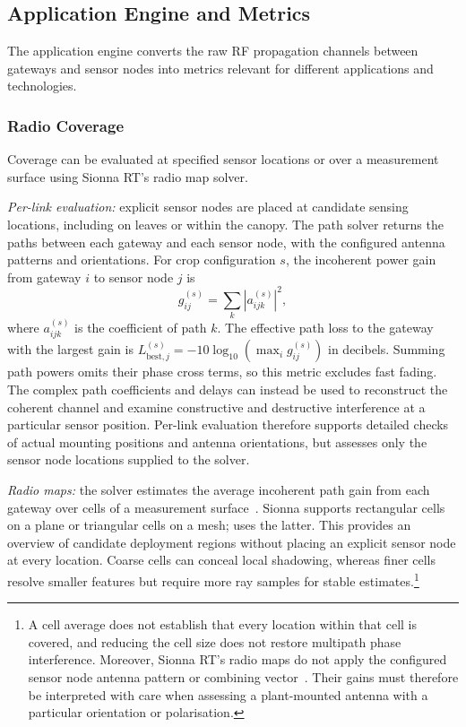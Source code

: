 \subsection{Application Engine and Metrics}\label{sec:metrics}
The application engine converts the raw RF propagation channels between gateways and sensor nodes into metrics relevant for different applications and technologies.

\subsubsection{Radio Coverage}
Coverage can be evaluated at specified sensor locations or over a measurement surface using Sionna RT's radio map solver.

\emph{Per-link evaluation:} explicit sensor nodes are placed at candidate sensing locations, including on leaves or within the canopy. The path solver returns the paths between each gateway and each sensor node, with the configured antenna patterns and orientations. For crop configuration $s$, the incoherent power gain from gateway $i$ to sensor node $j$ is
\begin{equation}
 g_{ij}^{(s)}=\sum_k\left|a_{ijk}^{(s)}\right|^2,
 \label{eq:coveragegain}
\end{equation}
where $a_{ijk}^{(s)}$ is the coefficient of path $k$. The effective path loss to the gateway with the largest gain is $L_{\mathrm{best},j}^{(s)}=-10\log_{10}\!\left(\max_i g_{ij}^{(s)}\right)$ in decibels. Summing path powers omits their phase cross terms, so this metric excludes fast fading. The complex path coefficients and delays can instead be used to reconstruct the coherent channel and examine constructive and destructive interference at a particular sensor position. Per-link evaluation therefore supports detailed checks of actual mounting positions and antenna orientations, but assesses only the sensor node locations supplied to the solver.

\emph{Radio maps:} the solver estimates the average incoherent path gain from each gateway over cells of a measurement surface~\cite{aoudia2025}. Sionna supports rectangular cells on a plane or triangular cells on a mesh; \housionna{} uses the latter. This provides an overview of candidate deployment regions without placing an explicit sensor node at every location. Coarse cells can conceal local shadowing, whereas finer cells resolve smaller features but require more ray samples for stable estimates.\footnote{A cell average does not establish that every location within that cell is covered, and reducing the cell size does not restore multipath phase interference. Moreover, Sionna RT's radio maps do not apply the configured sensor node antenna pattern or combining vector~\cite{sionnaRadioMaps}. Their gains must therefore be interpreted with care when assessing a plant-mounted antenna with a particular orientation or polarisation.}


